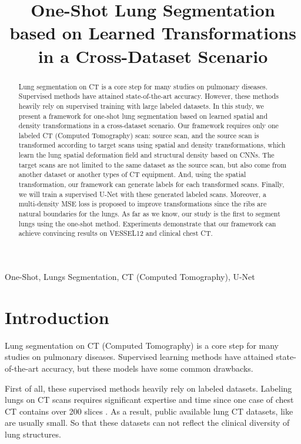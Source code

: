 \documentclass{article}
\title{One-Shot Lung Segmentation based on Learned Transformations in a Cross-Dataset Scenario
  }
\begin{document}
%
\maketitle
\begin{abstract}
    Lung segmentation on CT  is a core step for many studies on pulmonary diseases. Supervised methods have attained state-of-the-art accuracy. However, these methods heavily rely on supervised training with large labeled datasets.
    In this study, we present a framework for one-shot lung segmentation based on learned spatial and density transformations in a cross-dataset scenario.
    Our framework requires only one labeled CT (Computed Tomography) scan: source scan, and the source scan is transformed according to target scans using spatial and density transformations, which learn the lung spatial deformation field and structural density based on CNNs. The target scans are not limited to the same dataset as the source scan, but also come from another dataset or another types of CT equipment. 
    And, using the spatial transformation, our framework can generate labels for each transformed scans. Finally, we will train a supervised U-Net with these generated labeled scans.
    Moreover, a multi-density MSE loss is proposed to improve transformations since the ribs are natural boundaries for the lungs.
    As far as we know, our study is the first to segment lungs using the one-shot method. Experiments demonstrate that our framework can achieve convincing results on VESSEL12 and clinical chest CT.

\end{abstract}
%
\begin{keywords}
One-Shot, Lungs Segmentation, CT (Computed Tomography), U-Net
\end{keywords}
%
\section{Introduction}
\label{sec:intro}

Lung segmentation on CT (Computed Tomography) is a core step for many studies on pulmonary diseases. Supervised learning methods have attained state-of-the-art accuracy, but these models have some common drawbacks.

First of all, these supervised methods heavily rely on labeled datasets. Labeling lungs on CT scans requires significant expertise and time since one case of chest CT contains over 200 slices \cite{rudyanto2014comparing}. As a result, public available lung CT datasets, like \cite{rudyanto2014comparing, yang2017data} are usually small. So that these datasets can not reflect the clinical diversity of lung structures.
\end{document}
